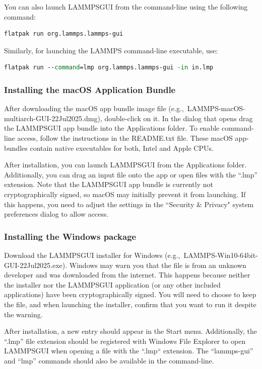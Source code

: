 \documentclass[9pt,tutorial]{livecoms}
\newcommand{\lammpsgui}{\textsf{LAMMPS\textendash GUI}}
\begin{document}
\begin{appendices}
You can also launch \lammpsgui{} from the command-line using the following command:
\begin{lstlisting}[language=tcl]
flatpak run org.lammps.lammps-gui
\end{lstlisting}
Similarly, for launching the LAMMPS command-line executable, use:
\begin{lstlisting}[language=tcl]
flatpak run --command=lmp org.lammps.lammps-gui -in in.lmp
\end{lstlisting}

\subsubsection{Installing the macOS Application Bundle}

After downloading the macOS app bundle image file
(e.g.,~LAMMPS-macOS-multiarch-GUI-22Jul2025.dmg), double-click
on it.  In the dialog that opens drag the \lammpsgui{} app bundle into
the Applications folder.  To enable command-line access, follow the
instructions in the README.txt file.  These macOS app-bundles contain
native executables for both, Intel and Apple CPUs.

After installation, you can launch \lammpsgui{} from the Applications
folder.  Additionally, you can drag an input file onto the app or open
files with the ``.lmp'' extension.  Note that the \lammpsgui{} app bundle is
currently not cryptographically signed, so macOS may initially prevent
it from launching.  If this happens, you need to adjust the settings in
the ``Security \& Privacy" system preferences dialog to allow access.

\subsubsection{Installing the Windows package}

Download the \lammpsgui{} installer for Windows
(e.g.,~LAMMPS-Win10-64bit-GUI-22Jul2025.exe).  Windows may warn
you that the file is from an unknown developer and was downloaded from
the internet.  This happens because neither the installer nor the
\lammpsgui{} application (or any other included applications) have been
cryptographically signed.  You will need to choose to keep the file, and
when launching the installer, confirm that you want to run it despite
the warning.

After installation, a new entry should appear in the Start menu.
Additionally, the ``.lmp'' file extension should be registered with
Windows File Explorer to open \lammpsgui{} when opening a file with the
``.lmp`` extension.  The ``lammps-gui'' and ``lmp'' commands should also
be available in the command-line.


\end{appendices}
\end{document}
